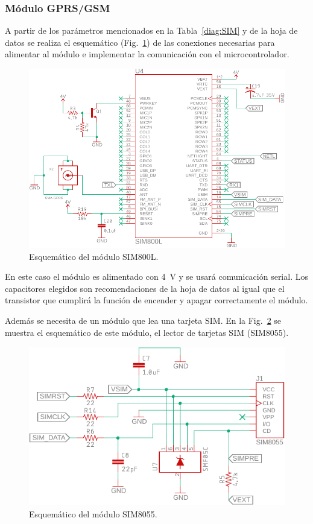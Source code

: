 \subsubsection{Módulo GPRS/GSM}
A partir de los parámetros mencionados en la Tabla~\ref{diag:SIM} y de la hoja de datos \cite{SIM800L} se realiza el esquemático (Fig.~\ref{fig:GSM_esquem}) de las conexiones necesarias para alimentar al módulo e implementar la comunicación con el microcontrolador.

\begin{figure}[htbp!]
\centering
\includegraphics[width=\textwidth]{GSM_esquem.pdf}
\caption{Esquemático del módulo SIM800L.}
\label{fig:GSM_esquem}
\end{figure}

En este caso el módulo es alimentado con \SI{4}{V} y se usará comunicación serial. Los capacitores elegidos son recomendaciones de la hoja de datos \cite{SIM800L} al igual que el transistor que cumplirá la función de encender y apagar correctamente el módulo.

Además se necesita de un módulo que lea una tarjeta SIM. En la Fig.~\ref{fig:GSM_SIM_esquem} se muestra el esquemático de este módulo, el lector de tarjetas SIM (SIM8055).

\begin{figure}[htbp!]
\centering
\includegraphics[width=\textwidth]{GSM_SIM_esquem.pdf}
\caption{Esquemático del módulo SIM8055.}
\label{fig:GSM_SIM_esquem}
\end{figure}

